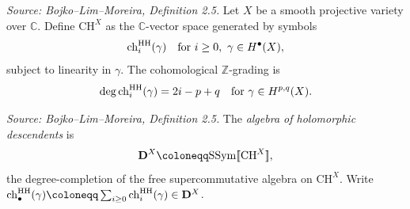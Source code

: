 \begin{definition}[HolDescendentSpace]
  \label{def:ch-space}
  \textit{Source: Bojko--Lim--Moreira, Definition 2.5.}
  Let \(X\) be a smooth projective variety over \(\mathbb{C}\). Define
  \(\mathrm{CH}^X\) as the \(\mathbb{C}\)-vector space generated by symbols
  \[\mathrm{ch}^{\mathrm{HH}}_i(\gamma) \quad \text{for } i \geq 0,\ \gamma \in H^\bullet(X),\]
  subject to linearity in \(\gamma\). The cohomological \(\mathbb{Z}\)-grading is
  \[\deg \mathrm{ch}^{\mathrm{HH}}_i(\gamma) = 2i - p + q \quad \text{for } \gamma \in H^{p,q}(X).\]
\end{definition}

\begin{definition}[DescendentAlgebra]
  \label{def:descendent-algebra}
  \textit{Source: Bojko--Lim--Moreira, Definition 2.5.}
  The \emph{algebra of holomorphic descendents} is
  \[\BD^X \coloneqq \SSym\llbracket \mathrm{CH}^X \rrbracket,\]
  the degree-completion of the free supercommutative algebra on \(\mathrm{CH}^X\).
  Write \(\chh_\bullet(\gamma) \coloneqq \sum_{i \geq 0} \chh_i(\gamma) \in \BD^X\).
\end{definition}


